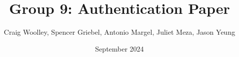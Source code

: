 \documentclass{article}
\title{Group 9: Authentication Paper}
\author{Craig Woolley, Spencer Griebel, Antonio Margel, Juliet Meza, Jason Yeung}
\date{September 2024}
\begin{document}
\maketitle

\begin{abstract}
    
\end{abstract}



\end{document}
